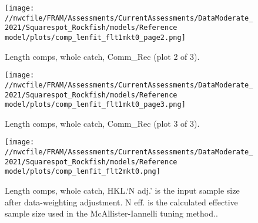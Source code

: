 \documentclass[11pt,
  english,
  a4paper,
]{article}
\begin{document}
\begin{figure}
\centering
\texttt{[image: //nwcfile/FRAM/Assessments/CurrentAssessments/DataModerate\_2021/Squarespot\_Rockfish/models/Reference model/plots/comp\_lenfit\_flt1mkt0\_page2.png]}
\caption{Length comps, whole catch, Comm\_Rec (plot 2 of 3).\label{fig:comp_lenfit_flt1mkt0_page2}}
\end{figure}

\tagmcend\tagstructend


\begin{figure}
\centering
\texttt{[image: //nwcfile/FRAM/Assessments/CurrentAssessments/DataModerate\_2021/Squarespot\_Rockfish/models/Reference model/plots/comp\_lenfit\_flt1mkt0\_page3.png]}
\caption{Length comps, whole catch, Comm\_Rec (plot 3 of 3).\label{fig:comp_lenfit_flt1mkt0_page3}}
\end{figure}

\tagmcend\tagstructend


\begin{figure}
\centering
\texttt{[image: //nwcfile/FRAM/Assessments/CurrentAssessments/DataModerate\_2021/Squarespot\_Rockfish/models/Reference model/plots/comp\_lenfit\_flt2mkt0.png]}
\caption{Length comps, whole catch, HKL.`N adj.' is the input sample size after data-weighting adjustment. N eff. is the calculated effective sample size used in the McAllister-Iannelli tuning method..\label{fig:comp_lenfit_flt2mkt0}}
\end{figure}

\tagmcend\tagstructend
\end{document}
